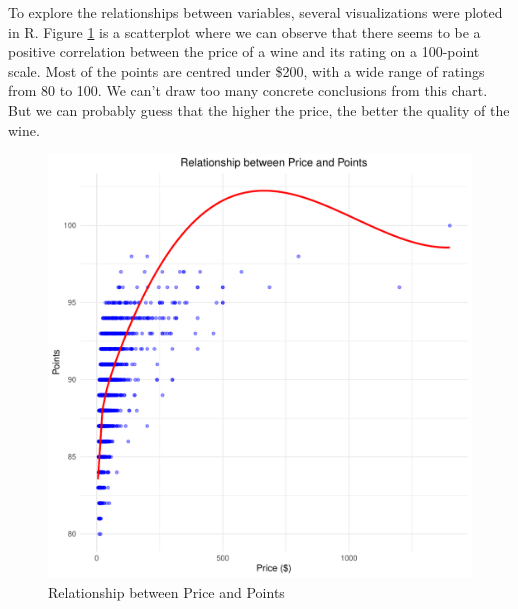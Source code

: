 \documentclass{article}
\begin{document}
To explore the relationships between variables, several visualizations were ploted in R. Figure \ref{fig:price_points} is a scatterplot where we can observe that there seems to be a positive correlation between the price of a wine and its rating on a 100-point scale. Most of the points are centred under \$200, with a wide range of ratings from 80 to 100. We can't draw too many concrete conclusions from this chart. But we can probably guess that the higher the price, the better the quality of the wine.
\begin{figure}[htbp]
	\centering
	\begin{minipage}{0.45\textwidth}
	\centering
	\includegraphics[width=\textwidth]{imgs/price_points_1.pdf}
	\caption{Relationship between Price and Points}
	\label{fig:price_points}
	\end{minipage}
	\hfill
	\begin{minipage}{0.45\textwidth}
	\centering

\end{minipage}
\end{figure}
\end{document}
